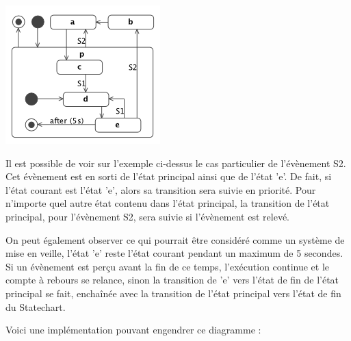 \documentclass[french, 12pt, a4paper]{article}
\begin{document}
         \begin{center}
			\captionsetup{type=figure}
			\includegraphics[scale=1]{Images/hierarchical_states.png}
	    \end{center}
        
        Il est possible de voir sur l'exemple ci-dessus le cas particulier de l'évènement S2. Cet évènement est en sorti de l'état principal ainsi que de l'état 'e'. De fait, si l'état courant est l'état 'e', alors sa transition sera suivie en priorité. Pour n'importe quel autre état contenu dans l'état principal, la transition de l'état principal, pour l'évènement S2, sera suivie si l'évènement est relevé.
        
        On peut également observer ce qui pourrait être considéré comme un système de mise en veille, l'état 'e' reste l'état courant pendant un maximum de 5 secondes. Si un évènement est perçu avant la fin de ce temps, l'exécution continue et le compte à rebours se relance, sinon la transition de 'e' vers l'état de fin de l'état principal se fait, enchaînée avec la transition de l'état principal vers l'état de fin du Statechart.
        \bigskip
        
        Voici une implémentation pouvant engendrer ce diagramme :
        
\end{document}
